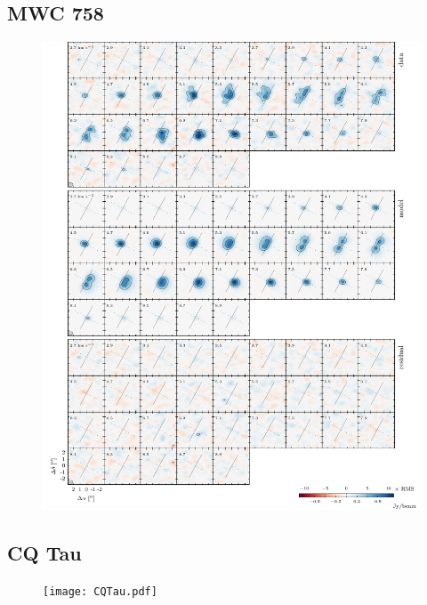 \documentclass[twocolumn]{aastex6}
\begin{document}
\subsection{MWC 758}

\begin{figure}[htb]
\begin{center}
  \includegraphics[draft]{MWC758.pdf}
  \end{center}
\end{figure}

\subsection{CQ Tau}

\begin{figure}[htb]
\begin{center}
  \texttt{[image: CQTau.pdf]}
  \end{center}
\end{figure}
\end{document}

